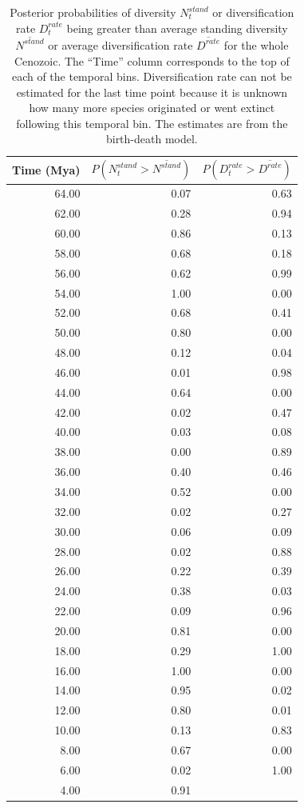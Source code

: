 \documentclass[12pt,letterpaper]{article}
\begin{document}
\begin{table}[ht]
  \centering
  \caption[Posterior probability estimates of a peak in diversity, diversification]{Posterior probabilities of diversity \(N^{stand}_{t}\) or diversification rate \(D^{rate}_{t}\) being greater than average standing diversity \(\overline{N^{stand}}\) or average diversification rate \(\overline{D^{rate}}\) for the whole Cenozoic. The ``Time'' column corresponds to the top of each of the temporal bins. Diversification rate can not be estimated for the last time point because it is unknown how many more species originated or went extinct following this temporal bin. The estimates are from the birth-death model.}
  \label{tab:div_peak}
  \begin{tabular}{ r r r }
    \hline
    Time (Mya) & \(P(N^{stand}_{t} > \overline{N^{stand}})\) & \(P(D^{rate}_{t} > \overline{D^{rate}})\) \\ 
    \hline
    64.00 & 0.07 & 0.63 \\ 
    62.00 & 0.28 & 0.94 \\ 
    60.00 & 0.86 & 0.13 \\ 
    58.00 & 0.68 & 0.18 \\ 
    56.00 & 0.62 & 0.99 \\ 
    54.00 & 1.00 & 0.00 \\ 
    52.00 & 0.68 & 0.41 \\ 
    50.00 & 0.80 & 0.00 \\ 
    48.00 & 0.12 & 0.04 \\ 
    46.00 & 0.01 & 0.98 \\ 
    44.00 & 0.64 & 0.00 \\ 
    42.00 & 0.02 & 0.47 \\ 
    40.00 & 0.03 & 0.08 \\ 
    38.00 & 0.00 & 0.89 \\ 
    36.00 & 0.40 & 0.46 \\ 
    34.00 & 0.52 & 0.00 \\ 
    32.00 & 0.02 & 0.27 \\ 
    30.00 & 0.06 & 0.09 \\ 
    28.00 & 0.02 & 0.88 \\ 
    26.00 & 0.22 & 0.39 \\ 
    24.00 & 0.38 & 0.03 \\ 
    22.00 & 0.09 & 0.96 \\ 
    20.00 & 0.81 & 0.00 \\ 
    18.00 & 0.29 & 1.00 \\ 
    16.00 & 1.00 & 0.00 \\ 
    14.00 & 0.95 & 0.02 \\ 
    12.00 & 0.80 & 0.01 \\ 
    10.00 & 0.13 & 0.83 \\ 
    8.00 & 0.67 & 0.00 \\ 
    6.00 & 0.02 & 1.00 \\ 
    4.00 & 0.91 &  \\ 
    \hline
  \end{tabular}
\end{table}
\end{document}
